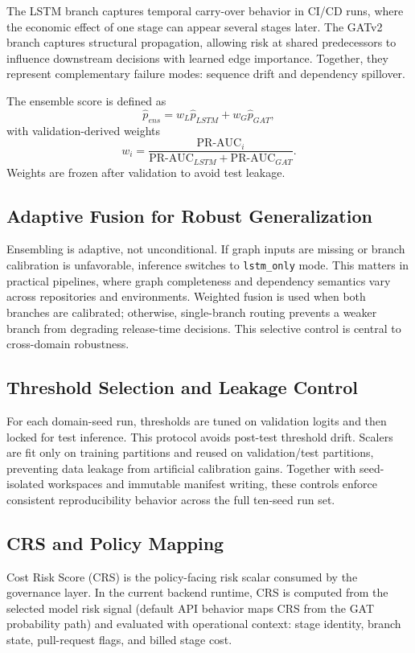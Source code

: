 \documentclass[journal]{IEEEtran}
\begin{document}
The LSTM branch captures temporal carry-over behavior in CI/CD runs, where the economic effect of one stage can appear several stages later. The GATv2 branch captures structural propagation, allowing risk at shared predecessors to influence downstream decisions with learned edge importance. Together, they represent complementary failure modes: sequence drift and dependency spillover.

The ensemble score is defined as
\begin{equation}
\hat{p}_{ens}=w_L\hat{p}_{LSTM}+w_G\hat{p}_{GAT},
\end{equation}
with validation-derived weights
\begin{equation}
w_i=\frac{\mathrm{PR\text{-}AUC}_i}{\mathrm{PR\text{-}AUC}_{LSTM}+\mathrm{PR\text{-}AUC}_{GAT}}.
\end{equation}
Weights are frozen after validation to avoid test leakage.

\subsection{Adaptive Fusion for Robust Generalization}
Ensembling is adaptive, not unconditional. If graph inputs are missing or branch calibration is unfavorable, inference switches to \texttt{lstm\_only} mode. This matters in practical pipelines, where graph completeness and dependency semantics vary across repositories and environments. Weighted fusion is used when both branches are calibrated; otherwise, single-branch routing prevents a weaker branch from degrading release-time decisions. This selective control is central to cross-domain robustness.

\subsection{Threshold Selection and Leakage Control}
For each domain-seed run, thresholds are tuned on validation logits and then locked for test inference. This protocol avoids post-test threshold drift. Scalers are fit only on training partitions and reused on validation/test partitions, preventing data leakage from artificial calibration gains. Together with seed-isolated workspaces and immutable manifest writing, these controls enforce consistent reproducibility behavior across the full ten-seed run set.

\subsection{CRS and Policy Mapping}
Cost Risk Score (CRS) is the policy-facing risk scalar consumed by the governance layer. In the current backend runtime, CRS is computed from the selected model risk signal (default API behavior maps CRS from the GAT probability path) and evaluated with operational context: stage identity, branch state, pull-request flags, and billed stage cost.
\end{document}
